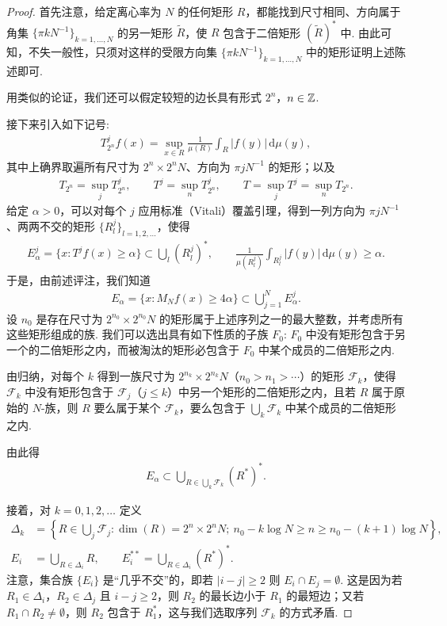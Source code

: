 \begin{proof}
首先注意，给定离心率为 $N$ 的任何矩形 $R$，都能找到尺寸相同、方向属于角集 $\{\pi k N^{-1}\}_{k=1,\ldots,N}$ 的另一矩形 $\tilde{R}$，使 $R$ 包含于二倍矩形 $(\tilde{R})^*$ 中. 由此可知，不失一般性，只须对这样的受限方向集 $\{\pi k N^{-1}\}_{k=1,\ldots,N}$ 中的矩形证明上述陈述即可.

用类似的论证，我们还可以假定较短的边长具有形式 $2^n$，$n \in \mathbb{Z}$.

接下来引入如下记号:
\begin{align*}
  T_{2^{n}}^{j}f(x)=\sup_{x\in R}\frac{1}{\mu(R)}\int_{R}\left|f(y)\right|\,\mathrm{d}\mu(y),
\end{align*}
其中上确界取遍所有尺寸为 $2^n \times 2^n N$、方向为 $\pi j N^{-1}$ 的矩形；以及
\begin{align*}
  T_{2^{n}}=\sup_{j}T_{2^{n}}^{j},\qquad
  T^{j}=\sup_{n}T_{2^{n}}^{j},\qquad
  T=\sup_{j}T^{j}=\sup_{n}T_{2^{n}}.
\end{align*}
给定 $\alpha > 0$，可以对每个 $j$ 应用标准（Vitali）覆盖引理，得到一列方向为 $\pi j N^{-1}$、两两不交的矩形 $\{R_l^j\}_{l=1,2,\ldots}$，使得
\begin{align*}
  E_{\alpha}^{j}=\{x:T^{j}f(x)\geq\alpha\}\subset\bigcup_{l}(R_{l}^{j})^{*},\qquad
  \frac{1}{\mu(R_{l}^{j})}\int_{R_{l}^{j}}|f(y)|\,\mathrm{d}\mu(y)\geq\alpha.
\end{align*}
于是，由前述评注，我们知道
\begin{align*}
  E_{\alpha}=\{x:M_{N}f(x)\geq 4\alpha\}\subset\bigcup_{j=1}^{N}E_{\alpha}^{j}.
\end{align*}
设 $n_0$ 是存在尺寸为 $2^{n_0} \times 2^{n_0} N$ 的矩形属于上述序列之一的最大整数，并考虑所有这些矩形组成的族. 我们可以选出具有如下性质的子族 $F_0$: $F_0$ 中没有矩形包含于另一个的二倍矩形之内，而被淘汰的矩形必包含于 $F_0$ 中某个成员的二倍矩形之内.

由归纳，对每个 $k$ 得到一族尺寸为 $2^{n_k} \times 2^{n_k} N$（$n_0 > n_1 > \cdots$）的矩形 $\mathcal{F}_k$，使得 $\mathcal{F}_k$ 中没有矩形包含于 $\mathcal{F}_j$（$j \leq k$）中另一个矩形的二倍矩形之内，且若 $R$ 属于原始的 $N$-族，则 $R$ 要么属于某个 $\mathcal{F}_k$，要么包含于 $\bigcup_k \mathcal{F}_k$ 中某个成员的二倍矩形之内.

由此得
\begin{align*}
  E_{\alpha}\subset\bigcup_{R\in\bigcup_{k}\mathcal{F}_{k}}(R^{*})^{*}.
\end{align*}

接着，对 $k = 0, 1, 2, \ldots$ 定义
\begin{align*}
  \Delta_{k}&=\left\{R\in\bigcup_{j}\mathcal{F}_{j}:\dim(R)=2^{n}\times 2^{n} N;\ n_{0}-k\log N\geq n\geq n_{0}-(k+1)\log N\right\},\\
  E_{i}&=\bigcup_{R\in\Delta_{i}}R,\qquad
  E_{i}^{**}=\bigcup_{R\in\Delta_{i}}\left(R^{*}\right)^{*}.
\end{align*}
注意，集合族 $\{E_i\}$ 是``几乎不交''的，即若 $|i - j| \geq 2$ 则 $E_i \cap E_j = \emptyset$. 这是因为若 $R_1 \in \Delta_i$，$R_2 \in \Delta_j$ 且 $i - j \geq 2$，则 $R_2$ 的最长边小于 $R_1$ 的最短边；又若 $R_1 \cap R_2 \neq \emptyset$，则 $R_2$ 包含于 $R_1^*$，这与我们选取序列 $\mathcal{F}_k$ 的方式矛盾.


\end{proof}
